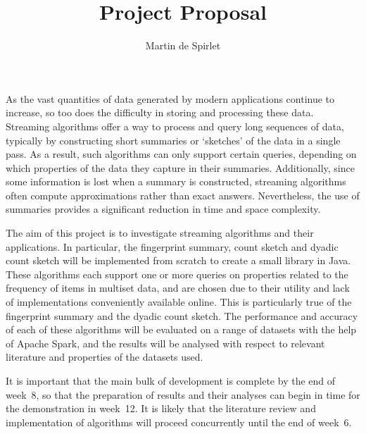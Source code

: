 \documentclass[
  11pt,
  a4paper,
]{article}
\title{Project Proposal}
\author{Martin de Spirlet}
\date{}
\begin{document}
\maketitle

As the vast quantities of data generated by modern applications continue to increase, so too does the difficulty in storing and processing these data.
Streaming algorithms offer a way to process and query long sequences of data, typically by constructing short summaries or `sketches' of the data in a single pass.
As a result, such algorithms can only support certain queries, depending on which properties of the data they capture in their summaries.
Additionally, since some information is lost when a summary is constructed, streaming algorithms often compute approximations rather than exact answers.
Nevertheless, the use of summaries provides a significant reduction in time and space complexity.

The aim of this project is to investigate streaming algorithms and their applications.
In particular, the fingerprint summary, count sketch and dyadic count sketch will be implemented from scratch to create a small library in Java.
These algorithms each support one or more queries on properties related to the frequency of items in multiset data, and are chosen due to their utility and lack of implementations conveniently available online.
This is particularly true of the fingerprint summary and the dyadic count sketch.
The performance and accuracy of each of these algorithms will be evaluated on a range of datasets with the help of Apache Spark, and the results will be analysed with respect to relevant literature and properties of the datasets used.

It is important that the main bulk of development is complete by the end of week~8, so that the preparation of results and their analyses can begin in time for the demonstration in week~12.
It is likely that the literature review and implementation of algorithms will proceed concurrently until the end of week~6.
\end{document}
